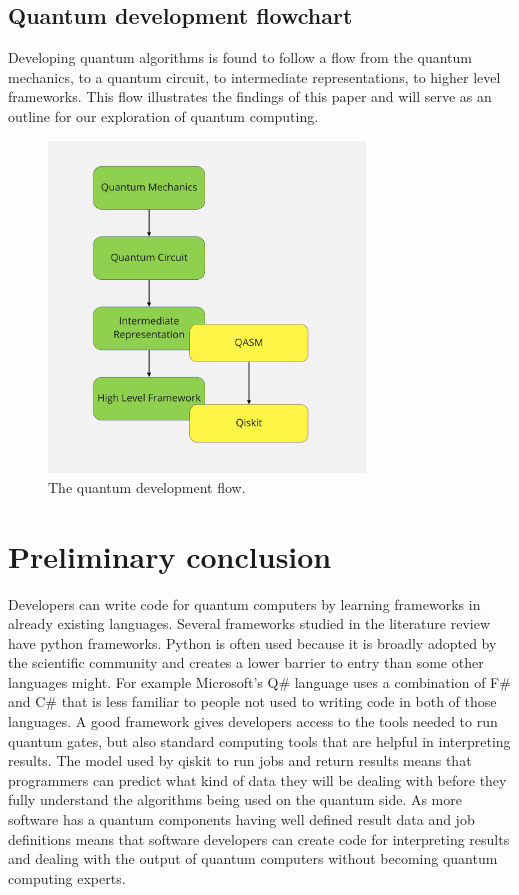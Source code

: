 \documentclass{article}
\begin{document}
\subsection{Quantum development flowchart}
Developing quantum algorithms is found to follow a flow from the quantum mechanics, to a quantum circuit, to intermediate representations, to higher level frameworks. This flow illustrates the findings of this paper and will serve as an outline for our exploration of quantum computing. 
\begin{figure}[H]
    \centering
    \includegraphics[width=0.75\textwidth]{flowchart.png}
    \caption{The quantum development flow.}
\end{figure}

\section{Preliminary conclusion}
Developers can write code for quantum computers by learning frameworks in already existing languages. Several frameworks studied in the literature review have python frameworks. Python is often used because it is broadly adopted by the scientific community and creates a lower barrier to entry than some other languages might. For example Microsoft's Q\# language uses a combination of F\# and C\# that is less familiar to people not used to writing code in both of those languages. A good framework gives developers access to the tools needed to run quantum gates, but also standard computing tools that are helpful in interpreting results. The model used by qiskit to run jobs and return results means that programmers can predict what kind of data they will be dealing with before they fully understand the algorithms being used on the quantum side. As more software has a quantum components having well defined result data and job definitions means that software developers can create code for interpreting results and dealing with the output of quantum computers without becoming quantum computing experts.
\end{document}
